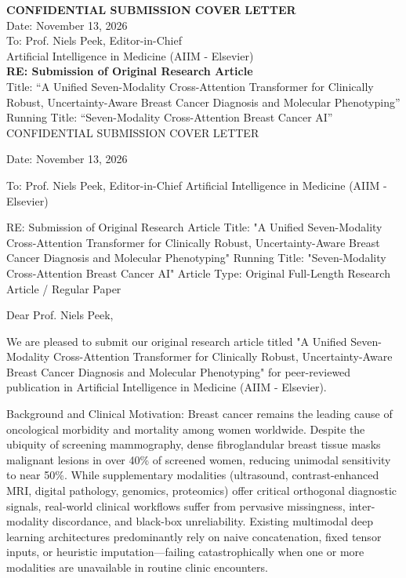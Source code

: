 \documentclass[11pt]{article}
\begin{document}
\noindent\textbf{CONFIDENTIAL SUBMISSION COVER LETTER}\\
\noindent Date: November 13, 2026\\
\noindent To: Prof. Niels Peek, Editor-in-Chief\\
\noindent Artificial Intelligence in Medicine (AIIM - Elsevier)\\
\vspace{0.5cm}
\noindent\textbf{RE: Submission of Original Research Article}\\
\noindent Title: ``A Unified Seven-Modality Cross-Attention Transformer for Clinically Robust, Uncertainty-Aware Breast Cancer Diagnosis and Molecular Phenotyping''\\
\noindent Running Title: ``Seven-Modality Cross-Attention Breast Cancer AI''\\
\vspace{0.5cm}
CONFIDENTIAL SUBMISSION COVER LETTER

Date: November 13, 2026

To:
Prof. Niels Peek, Editor-in-Chief
Artificial Intelligence in Medicine (AIIM - Elsevier)

RE: Submission of Original Research Article
Title: "A Unified Seven-Modality Cross-Attention Transformer for Clinically Robust, Uncertainty-Aware Breast Cancer Diagnosis and Molecular Phenotyping"
Running Title: "Seven-Modality Cross-Attention Breast Cancer AI"
Article Type: Original Full-Length Research Article / Regular Paper

Dear Prof. Niels Peek,

We are pleased to submit our original research article titled "A Unified Seven-Modality Cross-Attention Transformer for Clinically Robust, Uncertainty-Aware Breast Cancer Diagnosis and Molecular Phenotyping" for peer-reviewed publication in Artificial Intelligence in Medicine (AIIM - Elsevier).

Background and Clinical Motivation:
Breast cancer remains the leading cause of oncological morbidity and mortality among women worldwide. Despite the ubiquity of screening mammography, dense fibroglandular breast tissue masks malignant lesions in over 40\% of screened women, reducing unimodal sensitivity to near 50\%. While supplementary modalities (ultrasound, contrast-enhanced MRI, digital pathology, genomics, proteomics) offer critical orthogonal diagnostic signals, real-world clinical workflows suffer from pervasive missingness, inter-modality discordance, and black-box unreliability. Existing multimodal deep learning architectures predominantly rely on naive concatenation, fixed tensor inputs, or heuristic imputation—failing catastrophically when one or more modalities are unavailable in routine clinic encounters.
\end{document}
